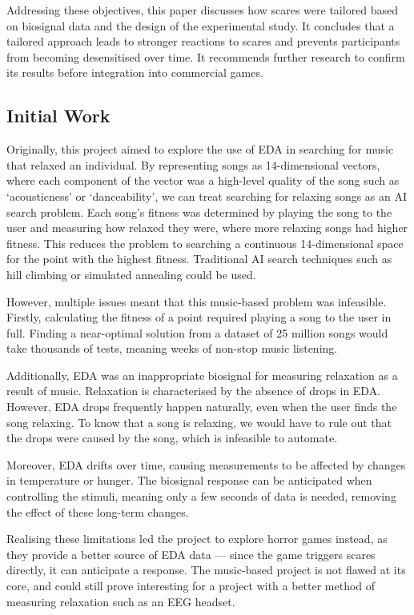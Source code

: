 \documentclass[12pt,a4paper]{article}\usepackage[]{graphicx}\usepackage[]{color}
\begin{document}
Addressing these objectives, this paper discusses how scares were tailored based on biosignal data and the design of the experimental study.
It concludes that a tailored approach leads to stronger reactions to scares and prevents participants from becoming desensitised over time.
It recommends further research to confirm its results before integration into commercial games.

\subsection{Initial Work}
\label{sec:Initial}

Originally, this project aimed to explore the use of EDA in searching for music that relaxed an individual.
By representing songs as 14-dimensional vectors, where each component of the vector was a high-level quality of the song such as `acousticness' or `danceability', we can treat searching for relaxing songs as an AI search problem.
Each song's fitness was determined by playing the song to the user and measuring how relaxed they were, where more relaxing songs had higher fitness.
This reduces the problem to searching a continuous 14-dimensional space for the point with the highest fitness.
Traditional AI search techniques such as hill climbing or simulated annealing could be used.

However, multiple issues meant that this music-based problem was infeasible.
Firstly, calculating the fitness of a point required playing a song to the user in full.
Finding a near-optimal solution from a dataset of 25 million songs would take thousands of tests, meaning weeks of non-stop music listening.

Additionally, EDA was an inappropriate biosignal for measuring relaxation as a result of music.
Relaxation is characterised by the absence of drops in EDA.
However, EDA drops frequently happen naturally, even when the user finds the song relaxing.
To know that a song is relaxing, we would have to rule out that the drops were caused by the song, which is infeasible to automate.

Moreover, EDA drifts over time, causing measurements to be affected by changes in temperature or hunger.
The biosignal response can be anticipated when controlling the stimuli, meaning only a few seconds of data is needed, removing the effect of these long-term changes.

Realising these limitations led the project to explore horror games instead, as they provide a better source of EDA data --- since the game triggers scares directly, it can anticipate a response.
The music-based project is not flawed at its core, and could still prove interesting for a project with a better method of measuring relaxation such as an EEG headset.
\end{document}
